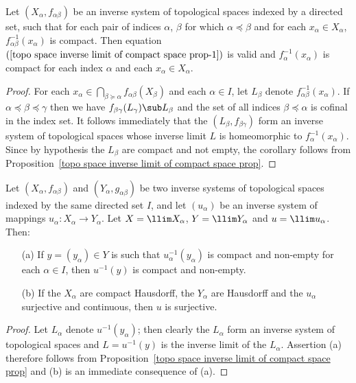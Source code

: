 \begin{corollary}\label{topo space inverse limit of compact fiber}
Let $(X_\alpha,f_{\alpha\beta})$ be an inverse system of topological spaces indexed by a directed set, such that for each pair of indices $\alpha$, $\beta$ for which $\alpha\preceq\beta$ and for each $x_\alpha\in X_\alpha$, $f_{\alpha\beta}^{-1}(x_\alpha)$ is compact. Then equation $(\ref{topo space inverse limit of compact space prop-1})$ is valid and $f_\alpha^{-1}(x_\alpha)$ is compact for each index $\alpha$ and each $x_\alpha\in X_\alpha$.
\end{corollary}
\begin{proof}
For each $x_\alpha\in\bigcap_{\beta\succeq\alpha}f_{\alpha\beta}(X_\beta)$ and each $\alpha\in I$, let $L_\beta$ denote $f_{\alpha\beta}^{-1}(x_\alpha)$. If $\alpha\preceq\beta\preceq\gamma$ then we have $f_{\beta\gamma}(L_\gamma)\sub L_\beta$ and the set of all indices $\beta\preceq\alpha$ is cofinal in the index set. It follows immediately that the $(L_\beta,f_{\beta\gamma})$ form an inverse system of topological spaces whose inverse limit $L$ is homeomorphic to $f_\alpha^{-1}(x_\alpha)$. Since by hypothesis the $L_\beta$ are compact and not empty, the corollary follows from Proposition~\ref{topo space inverse limit of compact space prop}.
\end{proof}
\begin{corollary}
Let $(X_\alpha,f_{\alpha\beta})$ and $(Y_\alpha,g_{\alpha\beta})$ be two inverse systems of topological spaces indexed by the same directed set $I$, and let $(u_\alpha)$ be an inverse system of mappings $u_\alpha:X_\alpha\to Y_\alpha$. Let $X=\llim X_\alpha$, $Y=\llim Y_\alpha$ and $u=\llim u_\alpha$. Then:
\begin{itemize}
\item[(a)] If $y=(y_\alpha)\in Y$ is such that $u_\alpha^{-1}(y_\alpha)$ is compact and non-empty for each $\alpha\in I$, then $u^{-1}(y)$ is compact and non-empty.
\item[(b)] If the $X_\alpha$ are compact Hausdorff, the $Y_\alpha$ are Hausdorff and the $u_\alpha$ surjective and continuous, then $u$ is surjective.
\end{itemize}
\end{corollary}
\begin{proof}
Let $L_\alpha$ denote $u^{-1}(y_\alpha)$; then clearly the $L_\alpha$ form an inverse system of topological spaces and $L=u^{-1}(y)$ is the inverse limit of the $L_\alpha$. Assertion (a) therefore follows from Proposition~\ref{topo space inverse limit of compact space prop} and (b) is an immediate consequence of (a).
\end{proof}
